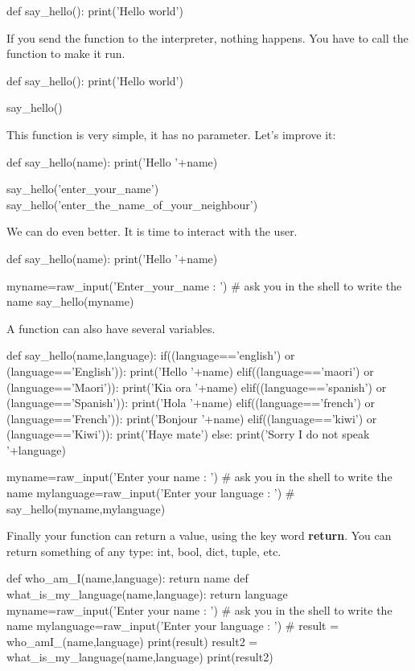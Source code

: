 \documentclass[article,10pt]{scrartcl}
\begin{document}
\begin{python}
def say_hello():
   print('Hello world')
\end{python}
If you send the function to the interpreter, nothing happens. You have to call the function to make it run.
\begin{python}
def say_hello():
   print('Hello world')

say_hello()
\end{python}
This function is very simple, it has no parameter. Let's improve it:
\begin{python}
def say_hello(name):
   print('Hello '+name)

say_hello('enter_your_name')
say_hello('enter_the_name_of_your_neighbour')
\end{python}
We can do even better. It is time to interact with the user.
\begin{python}
def say_hello(name):
   print('Hello '+name)

myname=raw_input('Enter_your_name : ') # ask you in the shell to write the name
say_hello(myname)
\end{python}
A function can also have several variables.
\begin{python}
def say_hello(name,language):
   if((language=='english') or (language=='English')):
      print('Hello '+name)
   elif((language=='maori') or (language=='Maori')):
      print('Kia ora '+name)
   elif((language=='spanish') or (language=='Spanish')):
      print('Hola '+name)
   elif((language=='french') or (language=='French')):
      print('Bonjour '+name)
   elif((language=='kiwi') or (language=='Kiwi')):
      print('Haye mate')
   else:
      print('Sorry I do not speak '+language)

myname=raw_input('Enter your name : ') # ask you in the shell to write the name
mylanguage=raw_input('Enter your language : ') # 
say_hello(myname,mylanguage)
\end{python}

Finally your function can return a value, using the key word \textbf{return}. You can return something of any type: int, bool, dict, tuple, etc.
\begin{python}
def who_am_I(name,language):
  return name
def what_is_my_language(name,language):
  return language
myname=raw_input('Enter your name : ') # ask you in the shell to write the name
mylanguage=raw_input('Enter your language : ') # 
result = who_amI_(name,language)
print(result)
result2 = what_is_my_language(name,language)
print(result2)
\end{python}
\end{document}
